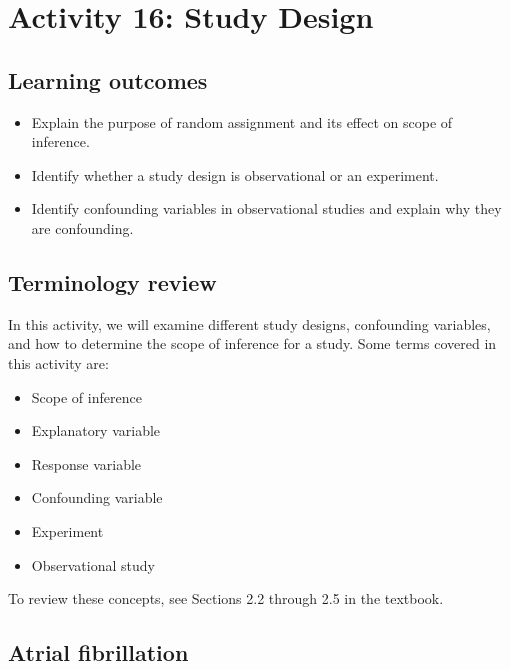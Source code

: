 \documentclass[
]{report}
\begin{document}
\vspace{0.5in}
\newpage

\section{Activity 16: Study Design}\label{activity-16-study-design}


\subsection{Learning outcomes}\label{learning-outcomes-17}

\begin{itemize}
\item
  Explain the purpose of random assignment and its effect on scope of inference.
\item
  Identify whether a study design is observational or an experiment.
\item
  Identify confounding variables in observational studies and explain why they are confounding.
\end{itemize}

\subsection{Terminology review}\label{terminology-review-14}

In this activity, we will examine different study designs, confounding variables, and how to determine the scope of inference for a study. Some terms covered in this activity are:

\begin{itemize}
\item
  Scope of inference
\item
  Explanatory variable
\item
  Response variable
\item
  Confounding variable
\item
  Experiment
\item
  Observational study
\end{itemize}

To review these concepts, see Sections 2.2 through 2.5 in the textbook.

\subsection{Atrial fibrillation}\label{atrial-fibrillation}
\end{document}
